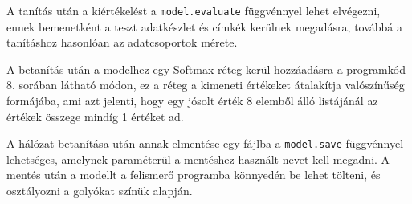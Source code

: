 \par A tanítás után a kiértékelést a \lstinline{model.evaluate} függvénnyel\cite{chollet2015keras,tensorflow_docs} lehet elvégezni, ennek bemenetként a teszt adatkészlet és címkék kerülnek megadásra, továbbá a tanításhoz hasonlóan az adatcsoportok mérete.
\par A betanítás után a modelhez egy Softmax réteg kerül hozzáadásra a programkód 8. sorában látható módon, ez a réteg a kimeneti értékeket átalakítja valószínűség formájába, ami azt jelenti, hogy egy jósolt érték 8 elemből álló listájánál az értékek összege mindíg 1 értéket ad.
\par A hálózat betanítása után annak elmentése egy fájlba a \lstinline{model.save} függvénnyel\cite{chollet2015keras,tensorflow_docs} lehetséges, amelynek paraméterül a mentéshez használt nevet kell megadni. A mentés után a modellt a felismerő programba könnyedén be lehet tölteni, és osztályozni a golyókat színük alapján.